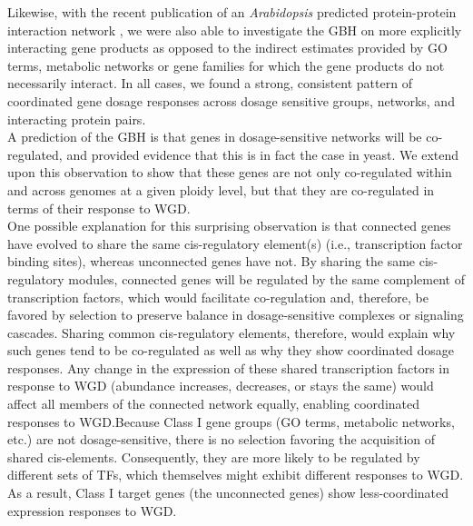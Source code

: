 \documentclass[11pt]{article}
\begin{document}
Likewise, with the recent publication of an \textit{Arabidopsis} predicted protein-protein interaction network \citep{dong2019}, we were also able to investigate the GBH on more explicitly interacting gene products as opposed to the indirect estimates provided by GO terms, metabolic networks or gene families for which the gene products do not necessarily interact.
In all cases, we found a strong, consistent pattern of coordinated gene dosage responses across dosage sensitive groups, networks, and interacting protein pairs.\\

A prediction of the GBH is that genes in dosage-sensitive networks will be co-regulated, and \cite{papp2003} provided evidence that this is in fact the case in yeast.
We extend upon this observation to show that these genes are not only co-regulated within and across genomes at a given ploidy level, but that they are co-regulated in terms of their response to WGD.\\

One possible explanation for this surprising observation is that connected genes have evolved to share the same cis-regulatory element(s) (i.e., transcription factor binding sites), whereas unconnected genes have not.
By sharing the same cis-regulatory modules, connected genes will be regulated by the same complement of transcription factors, which would facilitate co-regulation and, therefore, be favored by selection to preserve balance in dosage-sensitive complexes or signaling cascades.
Sharing common cis-regulatory elements, therefore, would explain why such genes tend to be co-regulated as well as why they show coordinated dosage responses.
Any change in the expression of these shared transcription factors in response to WGD (abundance increases, decreases, or stays the same) would affect all members of the connected network equally, enabling coordinated responses to WGD.Because Class I gene groups (GO terms, metabolic networks, etc.) are not dosage-sensitive, there is no selection favoring the acquisition of shared cis-elements.
Consequently, they are more likely to be regulated by different sets of TFs, which themselves might exhibit different responses to WGD.
As a result, Class I target genes (the unconnected genes) show less-coordinated expression responses to WGD.\\
\end{document}
